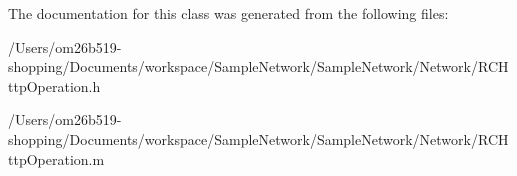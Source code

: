 The documentation for this class was generated from the following files\-:\begin{DoxyCompactItemize}
\item 
/\-Users/om26b519-\/shopping/\-Documents/workspace/\-Sample\-Network/\-Sample\-Network/\-Network/R\-C\-Http\-Operation.\-h\item 
/\-Users/om26b519-\/shopping/\-Documents/workspace/\-Sample\-Network/\-Sample\-Network/\-Network/R\-C\-Http\-Operation.\-m\end{DoxyCompactItemize}
